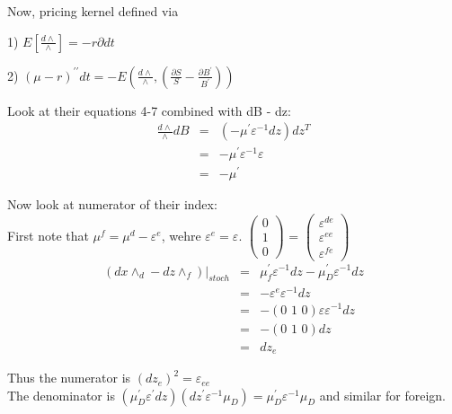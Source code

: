 \documentclass[]{article}
\begin{document}
Now, pricing kernel defined via 
\begin{list}{ }{}
\item 1) $E\left[\frac{d\wedge}{\wedge}\right] = -r \partial dt$
\item 2) $(\mu-r)^{\prime\prime} dt = -E\left(\frac{d\wedge}{\wedge}, \left(\frac{\partial S}{S}-\frac{\partial B^\prime}{B^\prime}\right)\right)$ 
\end{list}

Look at their equations 4-7 combined with dB - dz: \\
\begin{eqnarray*}
\frac{d\wedge}{\wedge} dB &=& (-\mu^\prime \varepsilon ^{-1} dz)dz^T\\
&=& -\mu^\prime \varepsilon ^{-1} \varepsilon\\
&=&-\mu^\prime 
\end{eqnarray*}

Now look at numerator of their index:\\
First note that $\mu^f = \mu^d - \varepsilon ^e$, wehre $\varepsilon ^e = \varepsilon . $ $ \left( \begin{array}{c}
0\\
1\\
0\end{array} \right)$ = $ \left( \begin{array}{c}
\varepsilon^{de}\\
\varepsilon^{ee}\\
\varepsilon^{fe}\end{array} \right)$\\

\begin{eqnarray*}
(dx \wedge_d - dz \wedge_f)|_{stoch} &=& \mu_f ^\prime \varepsilon ^{-1} dz - \mu_D^\prime \varepsilon ^{-1} dz\\
&=& -\varepsilon^e \varepsilon^{-1} dz\\
&=& -(\mbox{0 1 0})\varepsilon \varepsilon^{-1} dz\\
&=& -(\mbox{0 1 0})dz\\
&=& dz_e
\end{eqnarray*}

Thus the numerator is $(dz_e)^2 = \varepsilon_{ee}$\\

The denominator is $(\mu_D^\prime \varepsilon^\prime dz)(dz^\prime \varepsilon^{-1}\mu_D) = \mu_D^\prime \varepsilon ^{-1} \mu_D$ and similar for foreign.\\
\end{document}
